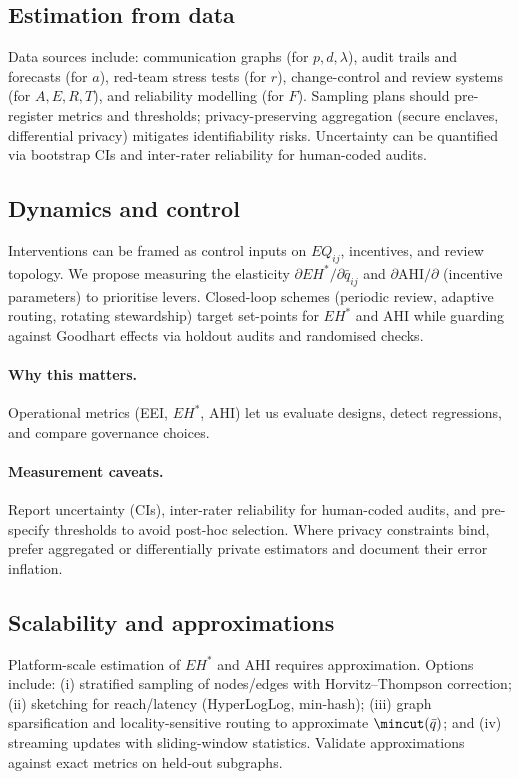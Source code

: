 \documentclass[12pt]{article}
\begin{document}
\subsection{Estimation from data}
Data sources include: communication graphs (for $p,d,\lambda$), audit trails and forecasts (for $a$), red-team stress tests (for $r$), change-control and review systems (for $A,E,R,T$), and reliability modelling (for $F$). Sampling plans should pre-register metrics and thresholds; privacy-preserving aggregation (secure enclaves, differential privacy) mitigates identifiability risks. Uncertainty can be quantified via bootstrap CIs and inter-rater reliability for human-coded audits.

\subsection{Dynamics and control}
Interventions can be framed as control inputs on $EQ_{ij}$, incentives, and review topology. We propose measuring the elasticity $\partial EH^{\ast}/\partial \bar{q}_{ij}$ and $\partial \mathrm{AHI}/\partial$ (incentive parameters) to prioritise levers. Closed-loop schemes (periodic review, adaptive routing, rotating stewardship) target set-points for $EH^{\ast}$ and AHI while guarding against Goodhart effects via holdout audits and randomised checks.

\paragraph{Why this matters.} Operational metrics (EEI, $EH^{\ast}$, AHI) let us evaluate designs, detect regressions, and compare governance choices.

\paragraph{Measurement caveats.} Report uncertainty (CIs), inter-rater reliability for human-coded audits, and pre-specify thresholds to avoid post-hoc selection. Where privacy constraints bind, prefer aggregated or differentially private estimators and document their error inflation.

\subsection{Scalability and approximations}
Platform-scale estimation of $EH^{\ast}$ and AHI requires approximation. Options include: (i) stratified sampling of nodes/edges with Horvitz--Thompson correction; (ii) sketching for reach/latency (HyperLogLog, min-hash); (iii) graph sparsification and locality-sensitive routing to approximate $\mincut(\bar q)$; and (iv) streaming updates with sliding-window statistics. Validate approximations against exact metrics on held-out subgraphs.
\end{document}
